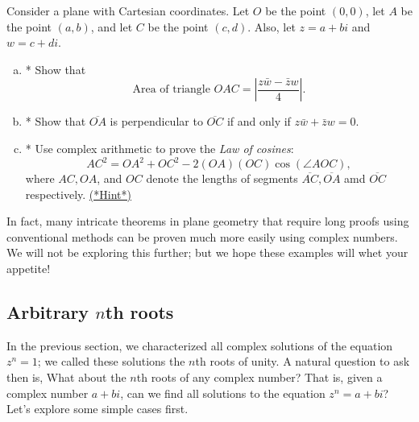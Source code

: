 {\begin{exercise}\label{exercise:complex:57}
Consider a plane with Cartesian coordinates. Let $O$ be the point $(0,0)$, let $A$ be the point $(a,b)$, and let $C$ be the point $(c,d)$. Also, let $z = a+bi$ and $w = c+di$.
\begin{enumerate}[(a)]
\item
*  Show that 
\[
\text{Area of triangle }OAC = \left| \frac{z \bar{w} - \bar{z} w}{4} \right|. \]
\item
* Show that $\overline{OA}$ is perpendicular to $\overline{OC}$ if and only if $z \bar{w} + \bar{z} w = 0$.
\item
* Use complex arithmetic to prove the \emph{Law of cosines}:
\[ AC^2 = OA^2 + OC^2 - 2(OA)(OC)\cos(\angle AOC),\]
where $AC,OA$, and $OC$ denote the lengths of segments $\overline{AC}, \overline{OA}$ amd $\overline{OC}$ respectively. 
\hyperref[sec:complex:hints]{(*Hint*)}

\end{enumerate}
\end{exercise}

In fact, many intricate theorems in plane geometry that require long proofs using conventional methods can be proven much more easily using complex numbers. We will not be exploring this further; but we hope these examples will whet your appetite!


\subsection{Arbitrary $n$th roots}
In the previous section, we characterized all complex solutions of the equation $z^n = 1$; we called these solutions the $n$th roots of unity. A natural question to ask then is, What about the $n$th roots of any complex number? That is, given a complex number $a + bi$, can we find all solutions to the equation $z^n = a + bi$? Let's explore some simple cases first.

}
